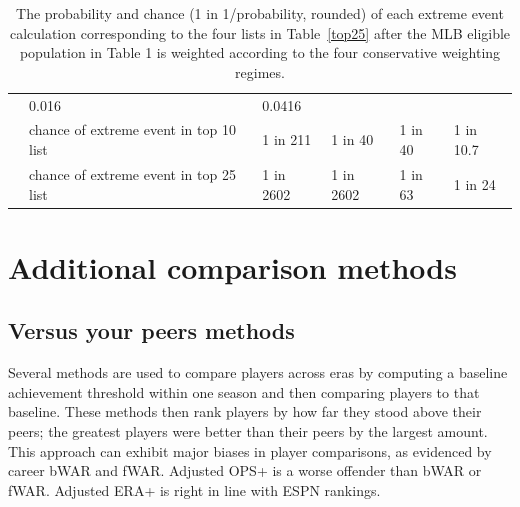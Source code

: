 \documentclass[11pt]{article}\usepackage[]{graphicx}\usepackage[]{color}
\begin{document}
\begin{table}[h!]
\begin{center}
\begin{tabular}{llllll}
  & 0.016 
  & 0.0416 \\
& chance of extreme event in top 10 list 
  & 1 in 211 
  & 1 in 40 
  & 1 in 40 
  & 1 in 10.7 \\
& chance of extreme event in top 25 list 
  & 1 in 2602 
  & 1 in 2602 
  & 1 in 63 
  & 1 in 24 \\
  \hline
\end{tabular}
\end{center}
\caption{The probability and chance (1 in 1/probability, rounded) 
  of each extreme event calculation corresponding to the four lists in 
  Table~\ref{top25} after the MLB eligible population in Table 1 is 
  weighted according to the four conservative weighting regimes.}
\label{probvalues.weights}
\end{table}



\section{Additional comparison methods}




\subsection{Versus your peers methods}
\label{WARcritique}

Several methods are used to compare players across eras by computing a 
baseline achievement threshold within one season and then comparing players 
to that baseline. These methods then rank players by how far they stood 
above their peers; the greatest players were better than their peers by 
the largest amount. 
This approach can exhibit major biases in player comparisons, as evidenced by 
career bWAR and fWAR.   Adjusted OPS+ is a worse offender 
than bWAR or fWAR.  Adjusted ERA+ is right in line with ESPN rankings.
\end{document}
